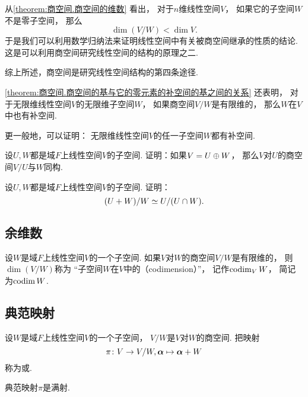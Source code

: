 从\cref{theorem:商空间.商空间的维数} 看出，
对于\(n\)维线性空间\(V\)，
如果它的子空间\(W\)不是零子空间，
那么\[
	\dim(V/W) < \dim V.
\]
于是我们可以利用数学归纳法来证明线性空间中有关被商空间继承的性质的结论.
这是可以利用商空间研究线性空间的结构的原理之二.

综上所述，商空间是研究线性空间结构的第四条途径.

\cref{theorem:商空间.商空间的基与它的零元素的补空间的基之间的关系} 还表明，
对于无限维线性空间\(V\)的无限维子空间\(W\)，
如果商空间\(V/W\)是有限维的，
那么\(W\)在\(V\)中也有补空间.

更一般地，可以证明：
无限维线性空间\(V\)的任一子空间\(W\)都有补空间.

\begin{example}
设\(U,W\)都是域\(F\)上线性空间\(V\)的子空间.
证明：如果\(V = U \oplus W\)，
那么\(V\)对\(U\)的商空间\(V/U\)与\(W\)同构.
\end{example}

\begin{example}
设\(U,W\)都是域\(F\)上线性空间\(V\)的子空间.
证明：\[
	(U+W)/W \simeq U/(U \cap W).
\]
\end{example}

\subsection{余维数}
\begin{definition}
设\(W\)是域\(F\)上线性空间\(V\)的一个子空间.
如果\(V\)对\(W\)的商空间\(V/W\)是有限维的，
则\(\dim(V/W)\)称为
“子空间\(W\)在\(V\)中的（codimension）”，
记作\(\operatorname{codim}_V W\)，
简记为\(\operatorname{codim} W\).
\end{definition}

\subsection{典范映射}
\begin{definition}
设\(W\)是域\(F\)上线性空间\(V\)的一个子空间，
\(V/W\)是\(V\)对\(W\)的商空间.
把映射\[
	\pi\colon V \to V/W,
	\boldsymbol\alpha \mapsto \boldsymbol\alpha+W
\]称为或.
\end{definition}
\begin{remark}
典范映射\(\pi\)是满射.
\end{remark}
